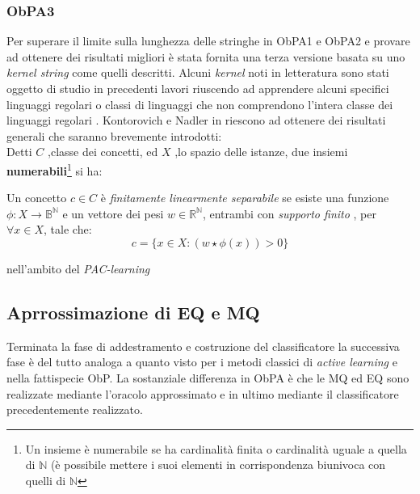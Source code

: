 \subsubsection{ObPA3}
Per superare il limite sulla lunghezza delle stringhe in \ac{ObPA}1 e \ac{ObPA}2 e provare ad ottenere dei risultati migliori è stata fornita una terza versione basata su uno \textit{kernel string} come quelli descritti. Alcuni  \textit{kernel} noti in letteratura sono stati oggetto di studio in precedenti lavori riuscendo ad apprendere alcuni specifici linguaggi regolari o classi di linguaggi che non comprendono l'intera classe dei linguaggi regolari \cite{Clark11}\cite{Clark06}. Kontorovich e Nadler in \cite{Kontorovich09} riescono ad ottenere dei risultati generali che saranno brevemente introdotti:\\
Detti $C$ ,classe dei concetti, ed $X$ ,lo spazio delle istanze, due insiemi \textbf{numerabili}\footnote{Un insieme è numerabile se ha cardinalità finita o cardinalità uguale a quella di $\mathbb{N}$ (è possibile mettere i suoi elementi in corrispondenza biunivoca con quelli di $\mathbb{N}$} si ha:
\begin{definizione*} Un concetto $c \in C$ è \textit{finitamente linearmente separabile} se esiste una funzione $\phi : X \to \mathbb{B}^{\mathbb{N}}$ e un vettore dei pesi $w \in \mathbb{R}^{\mathbb{N}}$, entrambi con \textit{supporto finito} , per $\forall x\in X$, tale che: 
\begin{equation*}
c = \{x \in X :  (w \star \phi(x))  > 0\}
\end{equation*}

\end{definizione*}



nell'ambito del \textit{PAC-learning} 

\subsection{Aprrossimazione di EQ e MQ}
Terminata la fase di addestramento e costruzione del classificatore la successiva fase  è  del tutto analoga a quanto visto per i metodi classici di \textit{active learning} e nella fattispecie \ac{ObP}. La sostanziale differenza in \ac{ObPA} è che le \ac{MQ} ed \ac{EQ} sono realizzate mediante l'oracolo approssimato e in ultimo mediante il classificatore precedentemente realizzato.
